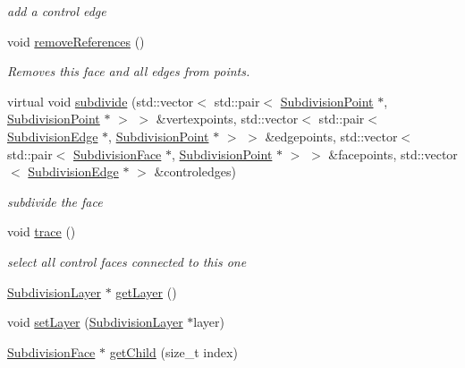 \begin{DoxyCompactItemize}
\begin{DoxyCompactList}\small\item\em add a control edge \end{DoxyCompactList}\item 
void \hyperlink{classShipCAD_1_1SubdivisionControlFace_a1c5253075cbe1f05ba004bee4edb8698}{remove\-References} ()
\begin{DoxyCompactList}\small\item\em Removes this face and all edges from points. \end{DoxyCompactList}\item 
virtual void \hyperlink{classShipCAD_1_1SubdivisionControlFace_aa17b5bb33ad87a4fa1e618156c171c64}{subdivide} (std\-::vector$<$ std\-::pair$<$ \hyperlink{classShipCAD_1_1SubdivisionPoint}{Subdivision\-Point} $\ast$, \hyperlink{classShipCAD_1_1SubdivisionPoint}{Subdivision\-Point} $\ast$ $>$ $>$ \&vertexpoints, std\-::vector$<$ std\-::pair$<$ \hyperlink{classShipCAD_1_1SubdivisionEdge}{Subdivision\-Edge} $\ast$, \hyperlink{classShipCAD_1_1SubdivisionPoint}{Subdivision\-Point} $\ast$ $>$ $>$ \&edgepoints, std\-::vector$<$ std\-::pair$<$ \hyperlink{classShipCAD_1_1SubdivisionFace}{Subdivision\-Face} $\ast$, \hyperlink{classShipCAD_1_1SubdivisionPoint}{Subdivision\-Point} $\ast$ $>$ $>$ \&facepoints, std\-::vector$<$ \hyperlink{classShipCAD_1_1SubdivisionEdge}{Subdivision\-Edge} $\ast$ $>$ \&controledges)
\begin{DoxyCompactList}\small\item\em subdivide the face \end{DoxyCompactList}\item 
void \hyperlink{classShipCAD_1_1SubdivisionControlFace_a768d000d2891ca110d6eb804abf80351}{trace} ()
\begin{DoxyCompactList}\small\item\em select all control faces connected to this one \end{DoxyCompactList}\item 
\hyperlink{classShipCAD_1_1SubdivisionLayer}{Subdivision\-Layer} $\ast$ \hyperlink{classShipCAD_1_1SubdivisionControlFace_a0eff0f187a3c95f0541fb29eda112cd6}{get\-Layer} ()
\item 
void \hyperlink{classShipCAD_1_1SubdivisionControlFace_a23631dfffd1c3ad7fc59537a4684fa01}{set\-Layer} (\hyperlink{classShipCAD_1_1SubdivisionLayer}{Subdivision\-Layer} $\ast$layer)
\item 
\hyperlink{classShipCAD_1_1SubdivisionFace}{Subdivision\-Face} $\ast$ \hyperlink{classShipCAD_1_1SubdivisionControlFace_a2c25793e1bed9472121e9126bacac3ce}{get\-Child} (size\-\_\-t index)

\end{DoxyCompactItemize}
